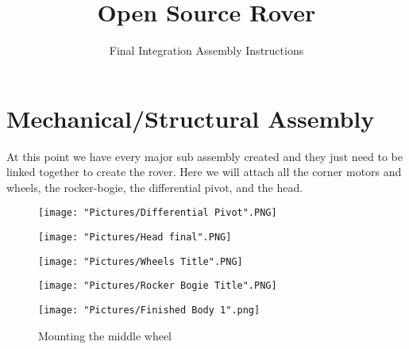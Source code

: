 \documentclass[12pt]{article}
\begin{document}
\title{Open Source Rover}
\author{Final Integration Assembly Instructions}

\makeatletter         
\def\@maketitle{
\begin{center}	
	\makebox[\textwidth][c]{ \texttt{[image: "Pictures/Final Title".png]}}
	{\Huge \bfseries \sffamily \@title }\\[4ex] 
	{\huge \bfseries \sffamily \@author}\\[4ex] 
	\texttt{[image: "Pictures/JPL logo".png]}
\end{center}}
\makeatother

\maketitle


\newpage

\tableofcontents

\newpage



\section{Mechanical/Structural Assembly}
At this point we have every major sub assembly created and they just need to be linked together to create the rover. Here we will attach all the corner motors and wheels, the rocker-bogie, the differential pivot, and the head. 


\begin{figure}[H]
  	\centering
  	\begin{minipage}[b]{0.30\textwidth}
    		\texttt{[image: "Pictures/Differential Pivot".PNG]}
  	\end{minipage}
  	\hfill
  	\begin{minipage}[b]{0.30\textwidth}
    		\texttt{[image: "Pictures/Head final".PNG]}
  	\end{minipage}
    	\hfill
  	\begin{minipage}[b]{0.30\textwidth}
    		\texttt{[image: "Pictures/Wheels Title".PNG]}
  	\end{minipage}
\end{figure}

\begin{figure}[H]
  \centering
  \begin{minipage}[b]{0.45\textwidth}
    \texttt{[image: "Pictures/Rocker Bogie Title".PNG]}
  \end{minipage}
  \hfill
  \begin{minipage}[b]{0.45\textwidth}
    \texttt{[image: "Pictures/Finished Body 1".png]}
  \end{minipage}
  \caption{Mounting the middle wheel}
\end{figure}
\end{document}
